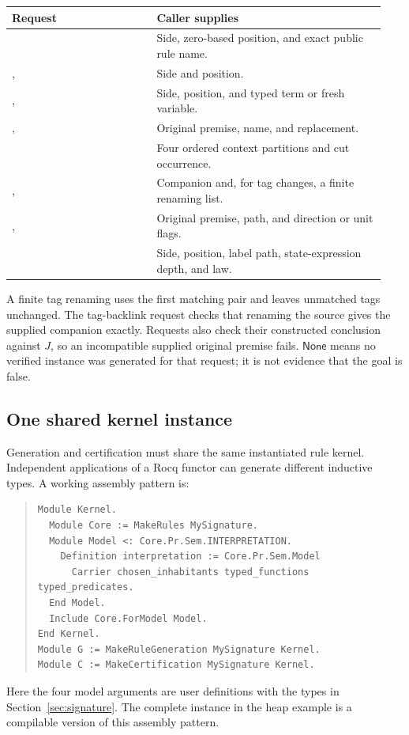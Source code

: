 \begin{center}
\begin{tabular}{@{}L{0.36\linewidth}L{0.58\linewidth}@{}}
\toprule
Request & Caller supplies\\
\midrule
{} & Side, zero-based position, and exact public rule name.\\
,  & Side and position.\\
,  & Side, position, and typed term or fresh variable.\\
,  & Original premise, name, and replacement.\\
 & Four ordered context partitions and cut occurrence.\\
,  & Companion and, for tag changes, a finite renaming list.\\
,  & Original premise, path, and direction or unit flags.\\
 & Side, position, label path, state-expression depth, and law.\\
\bottomrule
\end{tabular}
\end{center}

A finite tag renaming uses the first matching pair and leaves unmatched tags
unchanged. The tag-backlink request checks that renaming the source gives
the supplied companion exactly. Requests also check their constructed
conclusion against $J$, so an incompatible supplied original premise fails.
$\mathsf{None}$ means no verified instance was generated for that request;
it is not evidence that the goal is false.

\subsection{One shared kernel instance}
Generation and certification must share the same instantiated rule kernel.
Independent applications of a Rocq functor can generate different inductive
types. A working assembly pattern is:
\begin{quote}\small
\begin{verbatim}
Module Kernel.
  Module Core := MakeRules MySignature.
  Module Model <: Core.Pr.Sem.INTERPRETATION.
    Definition interpretation := Core.Pr.Sem.Model
      Carrier chosen_inhabitants typed_functions typed_predicates.
  End Model.
  Include Core.ForModel Model.
End Kernel.
Module G := MakeRuleGeneration MySignature Kernel.
Module C := MakeCertification MySignature Kernel.
\end{verbatim}
\end{quote}
Here the four model arguments are user definitions with the types in
Section~\ref{sec:signature}. The complete instance in the heap example is a
compilable version of this assembly pattern.

